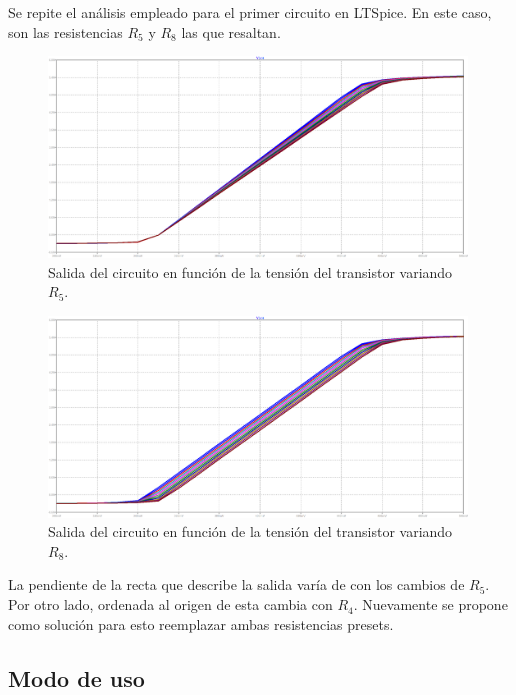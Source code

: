 \documentclass[a4paper]{article}
\begin{document}
Se repite el análisis empleado para el primer circuito en LTSpice. En este caso, son las resistencias $R_5$ y $R_8$ las que resaltan.

\begin{figure}[H]
	\centering
	\includegraphics[width=0.99\textwidth]{Ejercicio6/Imagenes/StepR5-M2.png}
	\caption{Salida del circuito en función de la tensión del transistor variando $R_5$.}
	\label{fig:r5-M2}
\end{figure}

\begin{figure}[H]
	\centering
	\includegraphics[width=0.99\textwidth]{Ejercicio6/Imagenes/StepR8-M2.png}
	\caption{Salida del circuito en función de la tensión del transistor variando $R_8$.}
	\label{fig:r8-M2}
\end{figure}

La pendiente de la recta que describe la salida varía de con los cambios de $R_5$. Por otro lado, ordenada al origen de esta cambia con $R_4$. Nuevamente se propone como solución para esto reemplazar ambas resistencias presets.

\subsection{Modo de uso}
\end{document}
